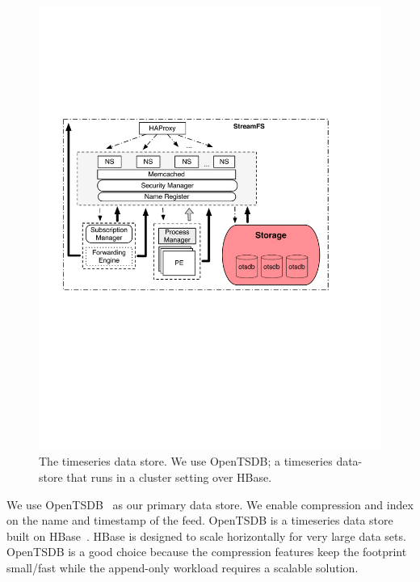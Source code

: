 \begin{figure}[h!] %
\centering
\includegraphics[width=.55\columnwidth]{figs/tsdstore}
\caption{The timeseries data store.  We use OpenTSDB; a timeseries data-store that runs in a cluster setting over
HBase.}
\label{fig:tsdb}
\end{figure}

We use OpenTSDB~\cite{opentsdb} as our primary data store. We enable compression  and index on the name and timestamp 
of the feed.  OpenTSDB is a timeseries data store built on HBase~\cite{HBase}.  HBase is designed to scale horizontally for very
large data sets.  OpenTSDB is a good choice because the compression features keep the footprint small/fast while the append-only 
workload requires a scalable solution.
